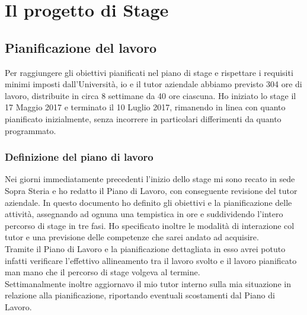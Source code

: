 
\chapter{Il progetto di Stage}

\section{Pianificazione del lavoro}
Per raggiungere gli obiettivi pianificati nel piano di stage e rispettare i requisiti minimi imposti dall'Università, io e il tutor aziendale abbiamo previsto 304 ore di lavoro, distribuite in circa 8 settimane da 40 ore ciascuna. Ho iniziato lo stage il 17 Maggio 2017 e terminato il 10 Luglio 2017, rimanendo in linea con quanto pianificato inizialmente, senza incorrere in particolari differimenti da quanto programmato.

\subsection{Definizione del piano di lavoro}
	Nei giorni immediatamente precedenti l'inizio dello stage mi sono recato in sede Sopra Steria e ho redatto il Piano di Lavoro, con conseguente revisione del tutor aziendale. In questo documento ho definito gli obiettivi e la pianificazione delle attività, assegnando ad ognuna una tempistica in ore e suddividendo l'intero percorso di stage in tre fasi. Ho specificato inoltre le modalità di interazione col tutor e una previsione delle competenze che sarei andato ad acquisire.\\

Tramite il Piano di Lavoro e la pianificazione dettagliata in esso avrei potuto infatti verificare l'effettivo allineamento tra il lavoro svolto e il lavoro pianificato man mano che il percorso di stage volgeva al termine.\\
	
Settimanalmente inoltre aggiornavo il mio tutor interno sulla mia situazione in relazione alla pianificazione, riportando eventuali scostamenti dal Piano di Lavoro. \\

